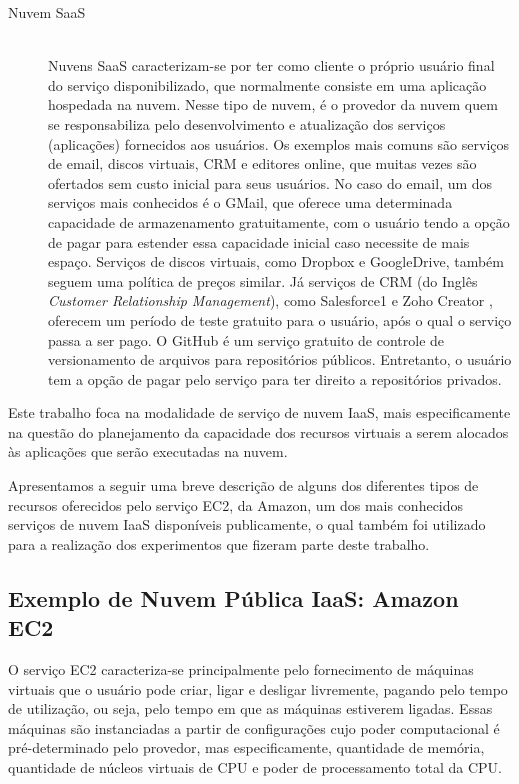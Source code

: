 \begin{description}
\item[Nuvem SaaS] \hfill \\ Nuvens SaaS caracterizam-se por ter como cliente o
próprio usuário final do serviço disponibilizado, que normalmente consiste em uma
aplicação hospedada na nuvem. Nesse tipo de nuvem, é o provedor da nuvem quem se
responsabiliza pelo desenvolvimento e atualização dos serviços (aplicações) 
fornecidos aos usuários. Os exemplos mais comuns são serviços de email, discos virtuais, 
CRM e editores online, que muitas vezes são ofertados sem custo inicial para seus 
usuários. No caso do email, um dos serviços mais conhecidos é o GMail, que oferece 
uma determinada capacidade de armazenamento gratuitamente, com o usuário tendo a 
opção de pagar para estender essa capacidade inicial caso necessite de mais espaço. 
Serviços de discos virtuais, como Dropbox e GoogleDrive, também seguem uma política 
de preços similar. Já serviços de CRM (do Inglês \emph{Customer Relationship Management}), 
como Salesforce1 \cite{salesforce} e Zoho Creator \cite{zoho}, oferecem um período de teste gratuito 
para o usuário, após o qual o serviço passa a ser pago. O GitHub \cite{github} é um 
serviço gratuito de controle de versionamento de arquivos para repositórios 
públicos. Entretanto, o usuário tem a opção de pagar pelo serviço para ter direito 
a repositórios privados.



\end{description}

Este trabalho foca na modalidade de serviço de nuvem IaaS, mais especificamente na questão do planejamento da capacidade dos recursos virtuais a serem alocados às aplicações que serão executadas na nuvem.

Apresentamos a seguir uma breve descrição de alguns dos diferentes tipos de recursos oferecidos pelo serviço EC2,
da Amazon, um dos mais conhecidos serviços de nuvem IaaS disponíveis publicamente, o qual também foi utilizado para a realização dos experimentos que fizeram parte deste trabalho. 

\subsection{Exemplo de Nuvem Pública IaaS: Amazon EC2}

O serviço EC2 caracteriza-se principalmente pelo fornecimento de máquinas virtuais
que o usuário pode criar, ligar e desligar livremente, pagando pelo tempo de
utilização, ou seja, pelo tempo em que as máquinas estiverem ligadas. Essas 
máquinas são instanciadas a partir de configurações cujo poder computacional é 
pré-determinado pelo provedor, mas especificamente, quantidade de memória, 
quantidade de núcleos virtuais de CPU e poder de processamento total da CPU.

